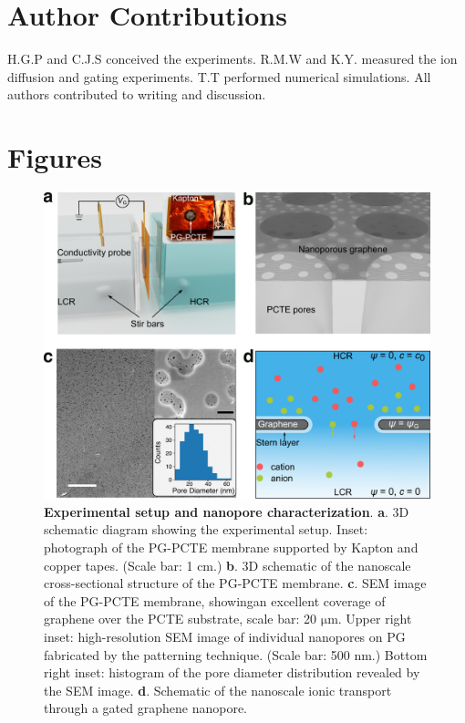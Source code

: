 \documentclass[journal=langd5,email=true, hyperref=true, keywords=false]{achemso}
\begin{document}
\section{Author Contributions}
\label{sec:author}

H.G.P and C.J.S conceived the experiments. R.M.W and K.Y. measured the ion
diffusion and gating experiments. T.T performed numerical
simulations. All authors contributed to writing and discussion.


\section*{}
\label{sec:ref}


\clearpage
\section{Figures}
\label{sec:figs}

\begin{figure}[htbp]
  \centering
  \includegraphics[width=0.95\linewidth]{img/fig1.pdf}
  \caption{\textbf{Experimental setup and nanopore characterization}.
    \textbf{a}. 3D schematic diagram showing the experimental
    setup. Inset: photograph of the PG-PCTE membrane supported by
    Kapton and copper tapes. (Scale bar: 1 cm.) \textbf{b}. 3D schematic
    of the nanoscale cross-sectional structure of the PG-PCTE
    membrane. \textbf{c}. SEM image of the PG-PCTE membrane, showingan
    excellent coverage of graphene over the PCTE substrate, scale bar:
    20 $\mathrm{\mu}$m.  Upper right inset: high-resolution SEM image
    of individual nanopores on PG fabricated by the patterning
    technique. (Scale bar: 500 nm.) Bottom right inset: histogram of the
    pore diameter distribution revealed by the SEM
    image. \textbf{d}. Schematic of the nanoscale ionic transport
    through a gated graphene nanopore.}
  \label{fig:1}
\end{figure}
\end{document}

